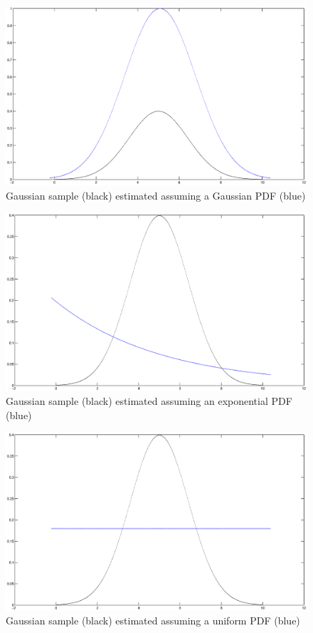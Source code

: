 \begin{figure}
\label{fig:gg}
\includegraphics[scale=0.4]{gauss-gauss}
\caption{Gaussian sample (black) estimated assuming a Gaussian PDF (blue)}
\end{figure}

\begin{figure}
\label{fig:ge}
\includegraphics[scale=0.4]{gauss-exp}
\caption{Gaussian sample (black) estimated assuming an exponential PDF (blue)}
\end{figure}

\begin{figure}
\label{fig:gu}
\includegraphics[scale=0.4]{gauss-uni}
\caption{Gaussian sample (black) estimated assuming a uniform PDF (blue)}
\end{figure}

